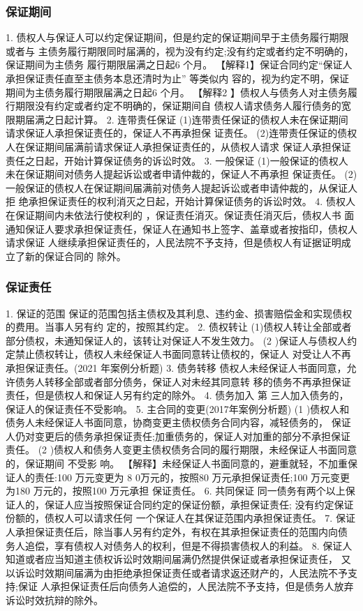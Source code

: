 \documentclass[UTF8,12pt]{ctexart}
\numberwithin{equation}{section} %
\numberwithin{figure}{section}
\numberwithin{table}{section}
\begin{document}
	\subsubsection{保证期间}
	1. 债权人与保证人可以约定保证期间，但是约定的保证期间早于主债务履行期限或者与 主债务履行期限同时届满的，视为没有约定;没有约定或者约定不明确的，保证期间为主债务 履行期限届满之日起6 个月。 【解释1】保证合同约定“保证人承担保证责任直至主债务本息还清时为止” 等类似内 容的，视为约定不明，保证期间为主债务履行期限届满之日起6 个月。
	【解释2 】债权人与债务人对主债务履行期限没有约定或者约定不明确的，保证期间自 债权人请求债务人履行债务的宽限期届满之日起计算。
	2. 连带责任保证 (1)连带责任保证的债权人未在保证期间请求保证人承担保证责任的，保证人不再承担保 证责任。 (2)连带责任保证的债权人在保证期间届满前请求保证人承担保证责任的，从债权人请求 保证人承担保证责任之日起，开始计算保证债务的诉讼时效。
	3. 一般保证 (1)一般保证的债权人未在保证期间对债务人提起诉讼或者申请仲裁的，保证人不再承担 保证责任。
	(2) 一般保证的债权人在保证期间届满前对债务人提起诉讼或者申请仲裁的，从保证人拒 绝承担保证责任的权利消灭之日起，开始计算保证债务的诉讼时效。
	4. 债权人在保证期间内未依法行使权利的 ，保证责任消灭。保证责任消灭后，债权人书 面通知保证人要求承担保证责任，保证人在通知书上签字、盖章或者按指印，债权人请求保证 人继续承担保证责任的，人民法院不予支持，但是债权人有证据证明成立了新的保证合同的 除外。
	
	\subsubsection{保证责任}
	1. 保证的范围 保证的范围包括主债权及其利息、违约金、损害赔偿金和实现债权的费用。当事人另有约 定的，按照其约定。
	2. 债权转让 (1)债权人转让全部或者部分债权，未通知保证人的，该转让对保证人不发生效力。
	(2 )保证人与债权人约定禁止债权转让，债权人未经保证人书面同意转让债权的，保证人 对受让人不再承担保证责任。(2021 年案例分析题)
	3. 债务转移 债权人未经保证人书面同意，允许债务人转移全部或者部分债务，保证人对未经其同意转 移的债务不再承担保证责任，但是债权人和保证人另有约定的除外。
	4. 债务加入
	第 三人加入债务的，保证人的保证责任不受影响。
	5. 主合同的变更(2017年案例分析题)
	(1 )债权人和债务人未经保证人书面同意，协商变更主债权债务合同内容，减轻债务的， 保证人仍对变更后的债务承担保证责任;加重债务的，保证人对加重的部分不承担保证责任。 (2 )债权人和债务人变更主债权债务合同的履行期限，未经保证人书面同意的，保证期间 不受影 响。
	【解释】未经保证人书面同意的，避重就轻，不加重保证人的责任:100 万元变更为 8 0万元的，按照80 万元承担保证责任;100 万元变更为180 万元的，按照100 万元承担 保证责任。
	6. 共同保证 同一债务有两个以上保证人的，保证人应当按照保证合同约定的保证份额，承担保证责任; 没有约定保证份额的，债权人可以请求任何 一个保证人在其保证范围内承担保证责任。
	7. 保证人承担保证责任后，除当事人另有约定外，有权在其承担保证责任的范围内向债 务人追偿，享有债权人对债务人的权利，但是不得损害债权人的利益。
	8. 保证人知道或者应当知道主债权诉讼时效期间届满仍然提供保证或者承担保证责任， 又以诉讼时效期间届满为由拒绝承担保证责任或者请求返还财产的，人民法院不予支持;保证 人承担保证责任后向债务人追偿的，人民法院不予支持，但是债务人放弃诉讼时效抗辩的除外。
	
\end{document}

